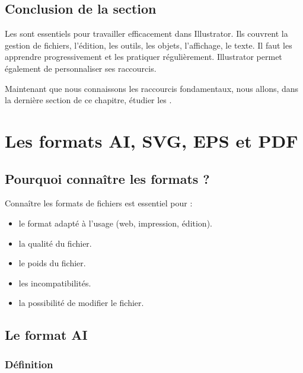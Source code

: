 \subsection*{Conclusion de la section}

Les  sont essentiels pour travailler efficacement dans Illustrator. Ils couvrent la gestion de fichiers, l'édition, les outils, les objets, l'affichage, le texte. Il faut les apprendre progressivement et les pratiquer régulièrement. Illustrator permet également de personnaliser ses raccourcis.

Maintenant que nous connaissons les raccourcis fondamentaux, nous allons, dans la dernière section de ce chapitre, étudier les .

\section{Les formats AI, SVG, EPS et PDF}

\subsection{Pourquoi connaître les formats ?}

Connaître les formats de fichiers est essentiel pour :

\begin{itemize}
    \item {} le format adapté à l'usage (web, impression, édition).
    \item {} la qualité du fichier.
    \item {} le poids du fichier.
    \item {} les incompatibilités.
    \item {} la possibilité de modifier le fichier.
\end{itemize}

\subsection{Le format AI}

\subsubsection{Définition}

